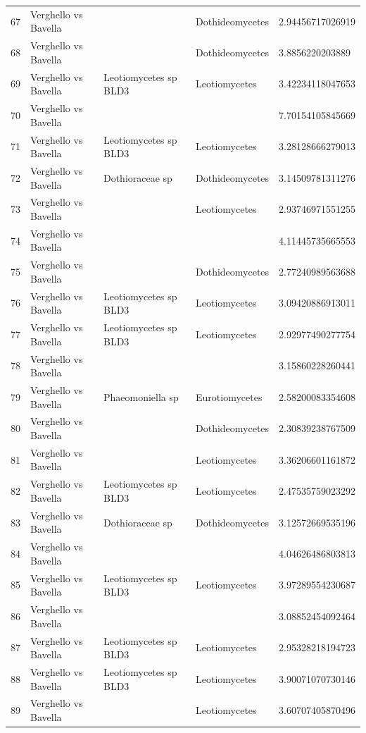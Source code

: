 \documentclass[12pt]{article}\usepackage[]{graphicx}\usepackage[]{color}
\numberwithin{figure}{section}
\begin{document}
\begin{table}[ht]
\begin{tabular}{lllll}
  67 & Verghello vs Bavella &  & Dothideomycetes & 2.94456717026919 \\ 
  68 & Verghello vs Bavella &  & Dothideomycetes & 3.8856220203889 \\ 
  69 & Verghello vs Bavella & Leotiomycetes sp BLD3 & Leotiomycetes & 3.42234118047653 \\ 
  70 & Verghello vs Bavella &  &  & 7.70154105845669 \\ 
  71 & Verghello vs Bavella & Leotiomycetes sp BLD3 & Leotiomycetes & 3.28128666279013 \\ 
  72 & Verghello vs Bavella & Dothioraceae sp & Dothideomycetes & 3.14509781311276 \\ 
  73 & Verghello vs Bavella &  & Leotiomycetes & 2.93746971551255 \\ 
  74 & Verghello vs Bavella &  &  & 4.11445735665553 \\ 
  75 & Verghello vs Bavella &  & Dothideomycetes & 2.77240989563688 \\ 
  76 & Verghello vs Bavella & Leotiomycetes sp BLD3 & Leotiomycetes & 3.09420886913011 \\ 
  77 & Verghello vs Bavella & Leotiomycetes sp BLD3 & Leotiomycetes & 2.92977490277754 \\ 
  78 & Verghello vs Bavella &  &  & 3.15860228260441 \\ 
  79 & Verghello vs Bavella & Phaeomoniella sp & Eurotiomycetes & 2.58200083354608 \\ 
  80 & Verghello vs Bavella &  & Dothideomycetes & 2.30839238767509 \\ 
  81 & Verghello vs Bavella &  & Leotiomycetes & 3.36206601161872 \\ 
  82 & Verghello vs Bavella & Leotiomycetes sp BLD3 & Leotiomycetes & 2.47535759023292 \\ 
  83 & Verghello vs Bavella & Dothioraceae sp & Dothideomycetes & 3.12572669535196 \\ 
  84 & Verghello vs Bavella &  &  & 4.04626486803813 \\ 
  85 & Verghello vs Bavella & Leotiomycetes sp BLD3 & Leotiomycetes & 3.97289554230687 \\ 
  86 & Verghello vs Bavella &  &  & 3.08852454092464 \\ 
  87 & Verghello vs Bavella & Leotiomycetes sp BLD3 & Leotiomycetes & 2.95328218194723 \\ 
  88 & Verghello vs Bavella & Leotiomycetes sp BLD3 & Leotiomycetes & 3.90071070730146 \\ 
  89 & Verghello vs Bavella &  & Leotiomycetes & 3.60707405870496 \\ 

\end{tabular}
\end{table}
\end{document}
